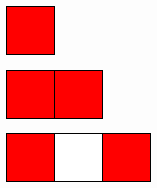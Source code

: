\begin{figure}[]
\centering
\hspace*{\fill}
\begin{subfigure}{0.03\textwidth}
	\includegraphics[width=\textwidth]{figures/1/1x1x1.pdf}
\end{subfigure} \hfill%
\begin{subfigure}{0.064\textwidth}
	\includegraphics[width=\textwidth]{figures/1/1x2x1.pdf}
\end{subfigure} \hfill%
\begin{subfigure}{0.1\textwidth}
	\includegraphics[width=\textwidth]{figures/1/1x3x1.pdf}

\end{subfigure}
\end{figure}
